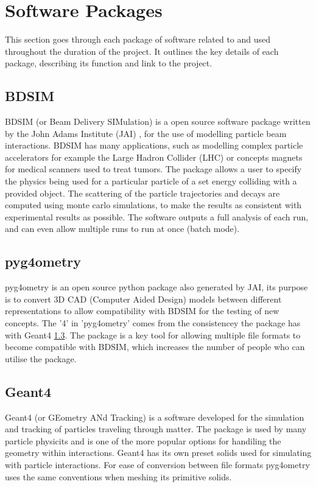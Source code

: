 \documentclass[12pt,a4paper]{article}
\begin{document}

\section{Software Packages}
\label{packs}
This section goes through each package of software related to and used throughout the duration of the project. It outlines the key details of each package, describing its function and link to the project.

\subsection{BDSIM}
\label{bdsim}
BDSIM (or Beam Delivery SIMulation) is a open source software package written by the John Adams Institute (JAI) \cite{jai}, for the use of modelling particle beam interactions. BDSIM has many applications, such as modelling complex particle accelerators for example the Large Hadron Collider (LHC) or concepts magnets for medical scanners used to treat tumors. The package allows a user to specify the physics being used for a particular particle of a set energy colliding with a provided object. The scattering of the particle trajectories and decays are computed using monte carlo simulations, to make the results as consistent with experimental results as possible. The software outputs a full analysis of each run, and can even allow multiple runs to run at once (batch mode).

\subsection{pyg4ometry}
\label{pyg}
pyg4ometry is an open source python package also generated by JAI, its purpose is to convert 3D CAD (Computer Aided Design) models between different representations to allow compatibility with BDSIM for the testing of new concepts. The '4' in 'pyg4ometry' comes from the consistencey the package has with Geant4 \ref{geant4}. The package is a key tool for allowing multiple file formats to become compatible with BDSIM, which increases the number of people who can utilise the package.

\subsection{Geant4}\label{geant4}
\label{g4}
Geant4 (or GEometry ANd Tracking) is a software developed for the simulation and tracking of particles traveling through matter. The package is used by many particle physicits and is one of the more popular options for handiling the geometry within interactions. Geant4 has its own preset solids used for simulating with particle interactions. For ease of conversion between file formats pyg4ometry uses the same conventions when meshing its primitive solids.
\end{document}
